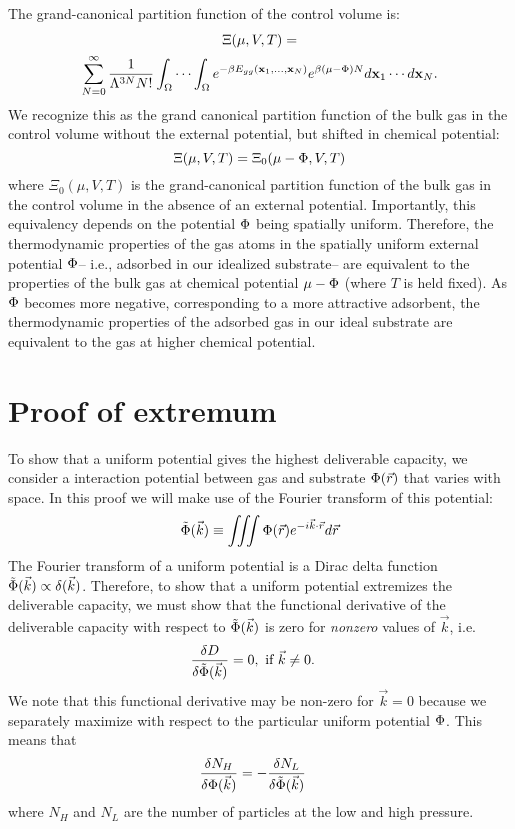 The grand-canonical partition function of the control volume is:
\begin{multline}
    \Xi(\mu, V, T)= \\ \displaystyle \sum_{N=0}^\infty \frac{1}{\Lambda^{3N}N!} \int_{\Omega} \cdots \int_{\Omega} e^{-\beta E_{gg}(\mathbf{x}_1, ..., \mathbf{x}_N)} e^{\beta (\mu - \Phi) N} d\mathbf{x}_1 \cdots d\mathbf{x}_N.
    \label{eq:gcpf}
\end{multline}
We recognize this as the grand canonical partition function of the bulk gas in
the control volume without the external potential, but shifted in chemical
potential:
\begin{equation}
    \Xi(\mu, V, T)=\Xi_0(\mu - \Phi, V, T)
    \label{eq:xi_vs_xi0}
\end{equation}
where $\Xi_0(\mu, V, T)$ is the grand-canonical partition function of the bulk
gas in the control volume in the absence of an external potential. Importantly,
this equivalency depends on the potential $\Phi$ being spatially uniform.
Therefore, the thermodynamic properties of the gas atoms in the spatially
uniform external potential $\Phi$-- i.e., adsorbed in our idealized substrate--
are equivalent to the properties of the bulk gas at chemical potential $\mu-\Phi$
(where $T$ is held fixed). As $\Phi$ becomes more negative, corresponding to a
more attractive adsorbent, the thermodynamic properties of the adsorbed gas in
our ideal substrate are equivalent to the gas at higher chemical potential.

\section{Proof of extremum}\label{sec:proof-extremum}
To show that a uniform potential gives the highest deliverable capacity, we
consider a interaction potential between gas and substrate $\Phi(\vec r)$ that
varies with space.  In this proof we will make use of the Fourier transform of
this potential:
\begin{align}
    \tilde\Phi(\vec k) \equiv \iiint \Phi(\vec r) e^{-i\vec k\cdot \vec r} d\vec r
\end{align}
The Fourier transform of a uniform potential is a Dirac delta function $\tilde{\Phi}(\vec k)\propto\delta(\vec k)$. Therefore, to show that a uniform potential
extremizes the deliverable capacity, we must show that the functional
derivative of the deliverable capacity with respect to $\tilde\Phi(\vec k)$ is zero for
\emph{nonzero} values of $\vec k$, i.e.
\begin{align}
    \frac{\delta D}{\delta \tilde\Phi(\vec k)} &= 0, \text{ if } \vec k\ne 0.
\end{align}
We note that this functional derivative may be non-zero for $\vec k=0$ because
we separately maximize with respect to the particular uniform potential $\Phi$.
This means that
\begin{align}
    \frac{\delta N_H}{\delta \Phi(\vec k)} &= -\frac{\delta N_L}{\delta \tilde\Phi(\vec k)}
\end{align}
where $N_H$ and $N_L$ are the number of particles at the low and high pressure.

